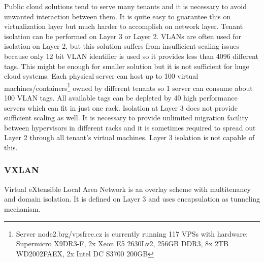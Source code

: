 Public cloud solutions tend to serve many tenants and it is necessary to avoid unwanted interaction between them. It is quite easy to guarantee this on virtualization layer but much harder to accomplish on network layer. Tenant isolation can be performed on Layer 3 or Layer 2. \Ac{VLAN}s are often used for isolation on Layer 2, but this solution suffers from insufficient scaling issues because only 12 bit \Ac{VLAN} identifier is used so it provides less than 4096 different tags. This might be enough for smaller solution but it is not sufficient for huge cloud systems. Each physical server can host up to 100 virtual machines/containers\footnote{Server node2.brg/vpsfree.cz is currently running 117 \Ac{VPS}s with hardware: Supermicro \mbox{X9DR3-F}, 2x Xeon E5 2630Lv2, 256GB DDR3, 8x 2TB WD2002FAEX, 2x Intel DC S3700 200GB} owned by different tenants so 1 server can consume about 100 \Ac{VLAN} tags. All available tags can be depleted by 40 high performance servers which can fit in just one rack. Isolation at Layer 3 does not provide sufficient scaling as well. It is necessary to provide unlimited migration facility between hypervisors in different racks and it is sometimes required to spread out Layer 2 through all tenant's virtual machines. Layer 3 isolation is not capable of this.



\subsubsection{VXLAN}
Virtual eXtensible Local Area Network is an overlay scheme with multitenancy and domain isolation. It is defined on Layer 3 and uses encapsulation as tunneling mechanism.

